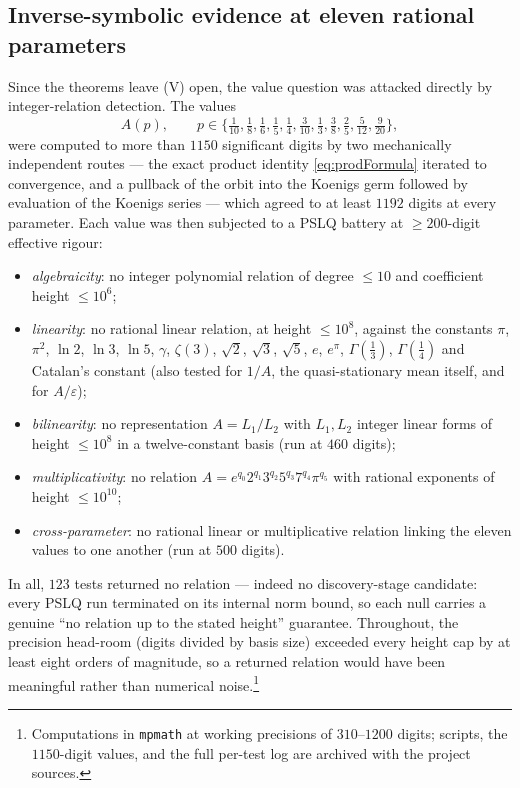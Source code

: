 \documentclass[11pt,a4paper]{article}
\theoremstyle{plain}
\theoremstyle{definition}
\begin{document}
\subsection{Inverse-symbolic evidence at eleven rational parameters}
\label{subsec:pslq}

Since the theorems leave (V) open, the value question was attacked directly by integer-relation detection. The values
\[
A(p),\qquad p\in\bigl\{\tfrac1{10},\tfrac18,\tfrac16,\tfrac15,\tfrac14,\tfrac3{10},\tfrac13,\tfrac38,\tfrac25,\tfrac5{12},\tfrac9{20}\bigr\},
\]
were computed to more than $1150$ significant digits by two mechanically independent routes --- the exact product identity \eqref{eq:prodFormula} iterated to convergence, and a pullback of the orbit into the Koenigs germ followed by evaluation of the Koenigs series --- which agreed to at least $1192$ digits at every parameter. Each value was then subjected to a PSLQ battery at $\ge200$-digit effective rigour:
\begin{itemize}
\item \emph{algebraicity}: no integer polynomial relation of degree $\le10$ and coefficient height $\le10^{6}$;
\item \emph{linearity}: no rational linear relation, at height $\le10^{8}$, against the constants $\pi$, $\pi^{2}$, $\ln2$, $\ln3$, $\ln5$, $\gamma$, $\zeta(3)$, $\sqrt2$, $\sqrt3$, $\sqrt5$, $e$, $e^{\pi}$, $\Gamma(\tfrac13)$, $\Gamma(\tfrac14)$ and Catalan's constant (also tested for $1/A$, the quasi-stationary mean itself, and for $A/\varepsilon$);
\item \emph{bilinearity}: no representation $A=L_1/L_2$ with $L_1,L_2$ integer linear forms of height $\le10^{8}$ in a twelve-constant basis (run at $460$ digits);
\item \emph{multiplicativity}: no relation $A=e^{q_0}2^{q_1}3^{q_2}5^{q_3}7^{q_4}\pi^{q_5}$ with rational exponents of height $\le10^{10}$;
\item \emph{cross-parameter}: no rational linear or multiplicative relation linking the eleven values to one another (run at $500$ digits).
\end{itemize}
In all, $123$ tests returned no relation --- indeed no discovery-stage candidate: every PSLQ run terminated on its internal norm bound, so each null carries a genuine ``no relation up to the stated height'' guarantee. Throughout, the precision head-room (digits divided by basis size) exceeded every height cap by at least eight orders of magnitude, so a returned relation would have been meaningful rather than numerical noise.\footnote{Computations in \texttt{mpmath} at working precisions of $310$--$1200$ digits; scripts, the $1150$-digit values, and the full per-test log are archived with the project sources.}
\end{document}
